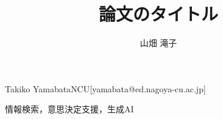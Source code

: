 \documentclass[submit,autodetect-engine,dvipdfmx,platex]{ipsj-mod}
\begin{document}
\title{論文のタイトル}

\author{山畑 滝子}{Takiko Yamabata}{NCU}[yamabata@ed.nagoya-cu.ac.jp]



\begin{abstract}

\end{abstract}

\begin{jkeyword}
情報検索，意思決定支援，生成AI
\end{jkeyword}


\maketitle





















\end{document}
